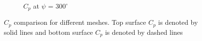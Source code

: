 \begin{figure}
\begin{subfigure}[b]{0.475\textwidth}
\caption{ $C_p$ at $\psi$ = $300^\circ$}
\label{fig:zonal_Cp_300}
\end{subfigure}
\caption{$C_p$ comparison for different meshes. Top surface $C_p$ is denoted by solid lines and bottom surface $C_p$ is denoted by dashed lines}
\label{fig:zonal_Cp_plots_TEV}
\end{figure}

